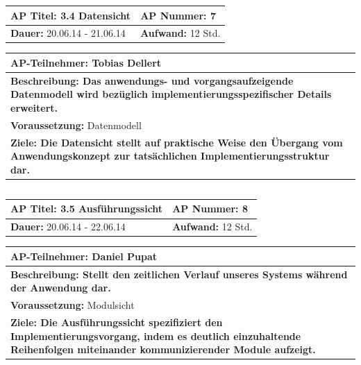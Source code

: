 \documentclass[fontsize=12pt,paper=a4,twoside]{scrartcl}
\begin{document}
\begin{tabular}{|p{7.43cm}|p{7.43cm}|}
\hline
\textbf{AP Titel: }3.4 Datensicht & \textbf{AP Nummer: }7\\ 
\hline
\textbf{Dauer: }20.06.14 - 21.06.14& \textbf{Aufwand: }12 Std.\\
\hline
\end{tabular}
\begin{tabular}{|p{15.3cm}|}
\hline
\textbf{AP-Teilnehmer: }Tobias Dellert\\
\hline
\textbf{Beschreibung: Das anwendungs- und vorgangsaufzeigende Datenmodell wird bezüglich implementierungsspezifischer Details erweitert. }\\
\hline
\textbf{Voraussetzung: }Datenmodell\\
\hline 
\textbf{Ziele: Die Datensicht stellt auf praktische Weise den Übergang vom Anwendungskonzept zur tatsächlichen Implementierungsstruktur dar.}\\
\hline 
\end{tabular}
\begin{verbatim}

\end{verbatim}

\begin{tabular}{|p{7.43cm}|p{7.43cm}|}
\hline
\textbf{AP Titel: }3.5 Ausführungssicht & \textbf{AP Nummer: }8\\ 
\hline
\textbf{Dauer: }20.06.14 - 22.06.14& \textbf{Aufwand: }12 Std.\\
\hline
\end{tabular}
\begin{tabular}{|p{15.3cm}|}
\hline
\textbf{AP-Teilnehmer: }Daniel Pupat \\
\hline
\textbf{Beschreibung: Stellt den zeitlichen Verlauf unseres Systems während der Anwendung dar.}\\
\hline
\textbf{Voraussetzung: }Modulsicht\\
\hline 
\textbf{Ziele: Die Ausführungssicht spezifiziert den Implementierungsvorgang, indem es deutlich einzuhaltende Reihenfolgen miteinander kommunizierender Module aufzeigt.}\\
\hline 
\end{tabular}
\begin{verbatim}

\end{verbatim}
\end{document}
